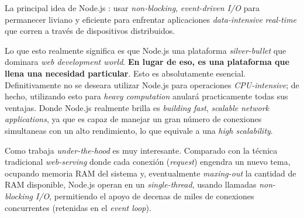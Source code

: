 

La principal idea de Node.js : usar \textit{non-blocking}, \textit{event-driven I/O} para permanecer liviano y eficiente para enfrentar aplicaciones \textit{data-intensive} \textit{real-time} que corren a través de dispositivos distribuidos.


Lo que esto realmente significa es que Node.js una plataforma \textit{silver-bullet} que dominara \textit{web development world}. \textbf{En lugar de eso, es una plataforma que llena una necesidad particular}. Esto es absolutamente esencial. Definitivamente no se deseara utilizar Node.js para operaciones \textit{CPU-intensive}; de hecho, utilizando esto para \textit{heavy computation} anulará practicamente todas sus ventajas. Donde Node.js realmente brilla es \textit{building fast}, \textit{scalable network applications}, ya que es capaz de manejar un gran número de conexiones simultaneas con un alto rendimiento, lo que equivale a una \textit{high scalability}.

Como trabaja \textit{under-the-hood} es muy interesante. Comparado con la técnica tradicional \textit{web-serving} donde cada conexión (\textit{request}) engendra un nuevo tema, ocupando memoria RAM del sistema y, eventualmente \textit{maxing-out} la cantidad de RAM disponible, Node.js operan en un \textit{single-thread}, usando llamadas \textit{non-blocking I/O}, permitiendo el apoyo de decenas de miles de conexiones concurrentes (retenidas en el \textit{event loop}).


